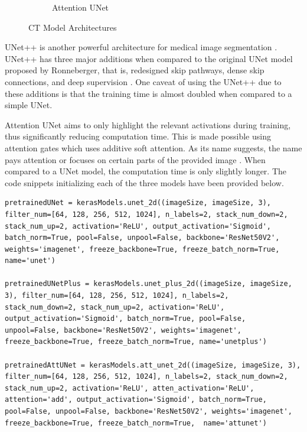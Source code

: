 \begin{figure}[H]
\begin{center}
\begin{subfigure}[b]{0.5\textwidth}
                \caption{Attention UNet \cite{AUN}}
                \label{fig:attUnet}
        \end{subfigure}%
        \caption{CT Model Architectures}\label{fig:ctmodels}
        \end{center}
\end{figure}

UNet++ is another powerful architecture for medical image segmentation \cite{ZSM+2020}. UNet++ has three major additions when compared to the original UNet model proposed by Ronneberger, that is, redesigned skip pathways, dense skip connections, and deep supervision \cite{JHJ2019}. One caveat of using the UNet++ due to these additions is that the training time is almost doubled when compared to a simple UNet.

Attention UNet aims to only highlight the relevant activations during training, thus significantly reducing computation time. This is made possible using attention gates which uses additive soft attention. As its name suggests, the name pays attention or focuses on certain parts of the provided image \cite{VIN2020, OSF+2020}. When compared to a UNet model, the computation time is only slightly longer. The code snippets initializing each of the three models have been provided below.

\vspace{1em}
\begin{lstlisting}
pretrainedUNet = kerasModels.unet_2d((imageSize, imageSize, 3), filter_num=[64, 128, 256, 512, 1024], n_labels=2, stack_num_down=2, stack_num_up=2, activation='ReLU', output_activation='Sigmoid', batch_norm=True, pool=False, unpool=False, backbone='ResNet50V2', weights='imagenet', freeze_backbone=True, freeze_batch_norm=True, name='unet') 

pretrainedUNetPlus = kerasModels.unet_plus_2d((imageSize, imageSize, 3), filter_num=[64, 128, 256, 512, 1024], n_labels=2, stack_num_down=2, stack_num_up=2, activation='ReLU', output_activation='Sigmoid', batch_norm=True, pool=False, unpool=False, backbone='ResNet50V2', weights='imagenet', freeze_backbone=True, freeze_batch_norm=True, name='unetplus')

pretrainedAttUNet = kerasModels.att_unet_2d((imageSize, imageSize, 3), filter_num=[64, 128, 256, 512, 1024], n_labels=2, stack_num_down=2, stack_num_up=2, activation='ReLU', atten_activation='ReLU', attention='add', output_activation='Sigmoid', batch_norm=True, pool=False, unpool=False, backbone='ResNet50V2', weights='imagenet', freeze_backbone=True, freeze_batch_norm=True,  name='attunet') 
\end{lstlisting}


